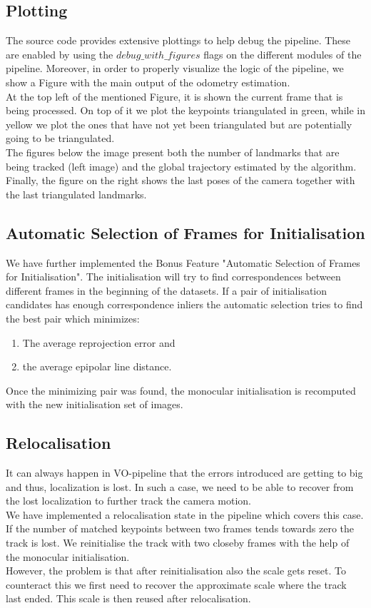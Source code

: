 \subsection{Plotting}
The source code provides extensive plottings to help debug the pipeline. These are enabled by using the $debug\_with\_figures$ flags
on the different modules of the pipeline. Moreover, in order to properly visualize the logic of the pipeline, we show a Figure 
with the main output of the odometry estimation. \\
At the top left of the mentioned Figure, it is shown the current frame that is being processed. On top of it we plot the keypoints
triangulated in green, while in yellow we plot the ones that have not yet been triangulated but are potentially going to be
triangulated. \\
The figures below the image present both the number of landmarks that are being tracked (left image) and the global trajectory
estimated by the algorithm. \\
Finally, the figure on the right shows the last poses of the camera together with the last triangulated landmarks.


\subsection{Automatic Selection of Frames for Initialisation}
We have further implemented the Bonus Feature "Automatic Selection of Frames for Initialisation". The initialisation will try to find correspondences between different frames in the beginning of the datasets. If a pair of initialisation candidates has enough correspondence inliers the automatic selection tries to find the best pair which minimizes:

\begin{enumerate}
\item The average reprojection error and 
\item the average epipolar line distance.
\end{enumerate}

Once the minimizing pair was found, the monocular initialisation is recomputed with the new initialisation set of images.

\subsection{Relocalisation}
It can always happen in VO-pipeline that the errors introduced are getting to big and thus, localization is lost. In such a case, we need to be able to recover from the lost localization to further track the camera motion. \\
We have implemented a relocalisation state in the pipeline which covers this case. If the number of matched keypoints between two frames tends towards zero the track is lost. We reinitialise the track with two closeby frames with the help of the monocular initialisation. \\
However, the problem is that after reinitialisation also the scale gets reset. To counteract this we first need to recover the approximate scale where the track last ended. This scale is then reused after relocalisation. 

